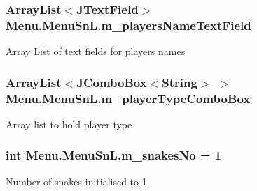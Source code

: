 \subsubsection[{m\+\_\+players\+Name\+Text\+Field}]{\setlength{\rightskip}{0pt plus 5cm}Array\+List$<$J\+Text\+Field$>$ Menu.\+Menu\+Sn\+L.\+m\+\_\+players\+Name\+Text\+Field\hspace{0.3cm}{\ttfamily [private]}}\label{class_menu_1_1_menu_sn_l_a8e5b5896ffe07afef10443fe99b45dab}
Array List of text fields for player\textquotesingle{}s names \hypertarget{class_menu_1_1_menu_sn_l_a70c6fa4562124ab11bab5d572daf82b3}{}
\subsubsection[{m\+\_\+player\+Type\+Combo\+Box}]{\setlength{\rightskip}{0pt plus 5cm}Array\+List$<$J\+Combo\+Box$<$String$>$ $>$ Menu.\+Menu\+Sn\+L.\+m\+\_\+player\+Type\+Combo\+Box\hspace{0.3cm}{\ttfamily [private]}}\label{class_menu_1_1_menu_sn_l_a70c6fa4562124ab11bab5d572daf82b3}
Array list to hold player type \hypertarget{class_menu_1_1_menu_sn_l_a5787c03e612eb9adb0f0ee976810be88}{}
\subsubsection[{m\+\_\+snakes\+No}]{\setlength{\rightskip}{0pt plus 5cm}int Menu.\+Menu\+Sn\+L.\+m\+\_\+snakes\+No = 1\hspace{0.3cm}{\ttfamily [private]}}\label{class_menu_1_1_menu_sn_l_a5787c03e612eb9adb0f0ee976810be88}
Number of snakes initialised to 1 \hypertarget{class_menu_1_1_menu_sn_l_afc7fd19db34602b6b5a85df60c736103}{}
